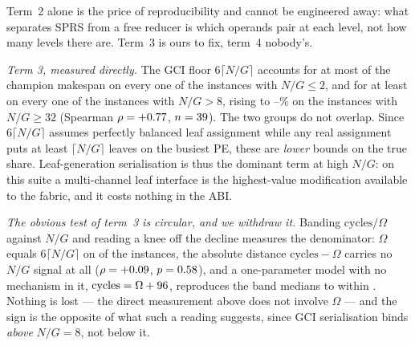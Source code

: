 \documentclass[journal,10pt]{IEEEtran}
\theoremstyle{plain}
\theoremstyle{definition}
\theoremstyle{remark}
\newcommand{\sprs}{\textsc{SPRS}}
\begin{document}
Term~2 alone is the price of reproducibility and cannot be engineered away:
what separates \sprs{} from a free reducer is which operands pair at each
level, not how many levels there are. Term~3 is ours to fix, term~4 nobody's.

\emph{Term 3, measured directly.} The GCI floor $6\lceil N/G\rceil$ accounts
for at most \GciShareLowMax{} of the champion makespan on every one of the
\GciLowInst{} instances with $N/G \le 2$, and for at least \GciShareHighMin{}
on every one of the \GciHighInst{} instances with $N/G > 8$, rising to
\GciShareTopLo{}--\GciShareTopHi{}\% on the \GciTopInst{} instances with
$N/G \ge 32$ (Spearman $\rho = +0.77{}$, $n = 39{}$). The two
groups do not overlap. Since $6\lceil N/G\rceil$ assumes perfectly balanced
leaf assignment while any real assignment puts at least $\lceil N/G\rceil$
leaves on the busiest PE, these are \emph{lower} bounds on the true share.
Leaf-generation serialisation is thus the dominant term at high $N/G$: on this
suite a multi-channel leaf interface is the highest-value modification
available to the fabric, and it costs nothing in the ABI.

\emph{The obvious test of term~3 is circular, and we withdraw it.} Banding
$\mathrm{cycles}/\Omega$ against $N/G$ and reading a knee off the decline
measures the denominator: $\Omega$ equals $6\lceil N/G\rceil$ on \GciOmegaEq{}
of the \TournNInst{} instances, the absolute distance $\mathrm{cycles}-\Omega$
carries no $N/G$ signal at all ($\rho = +0.09{}$, $p = 0.58{}$), and
a one-parameter model with no mechanism in it,
$\mathrm{cycles} = \Omega + 96{}$, reproduces the band medians to
within \GciNullTol{}. Nothing is lost --- the direct measurement above does not
involve $\Omega$ --- and the sign is the opposite of what such a reading
suggests, since GCI serialisation binds \emph{above} $N/G = 8$, not below it.


\end{document}
